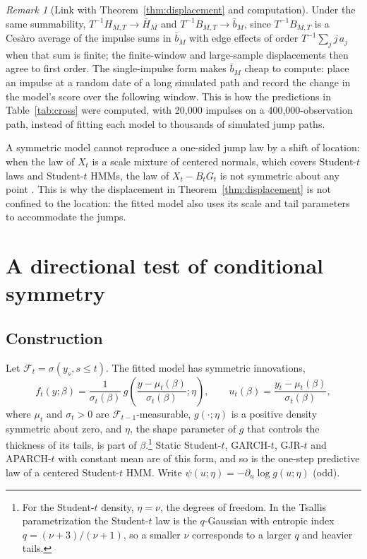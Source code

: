 \documentclass[11pt,a4paper]{article}
\theoremstyle{definition}
\theoremstyle{remark}
\newtheorem{remark}{Remark}
\newcommand{\F}{\mathcal{F}}
\begin{document}
\begin{remark}[Link with Theorem~\ref{thm:displacement} and computation]\label{rem:largeT}
Under the same summability, $T^{-1}H_{M,T}\to\bar H_M$ and $T^{-1}B_{M,T}\to\bar b_M$, since $T^{-1}B_{M,T}$ is a Ces\`aro average of the impulse sums in $\bar b_M$ with edge effects of order $T^{-1}\sum_jj\,a_j$ when that sum is finite; the finite-window and large-sample displacements then agree to first order. The single-impulse form makes $\bar b_M$ cheap to compute: place an impulse at a random date of a long simulated path and record the change in the model's score over the following window. This is how the predictions in Table~\ref{tab:cross} were computed, with 20{,}000 impulses on a 400{,}000-observation path, instead of fitting each model to thousands of simulated jump paths.
\end{remark}

\noindent A symmetric model cannot reproduce a one-sided jump law by a shift of location: when the law of $X_t$ is a scale mixture of centered normals, which covers Student-$t$ laws and Student-$t$ HMMs, the law of $X_t-B_tG_t$ is not symmetric about any point \citep{giornoB}. This is why the displacement in Theorem~\ref{thm:displacement} is not confined to the location: the fitted model also uses its scale and tail parameters to accommodate the jumps.

\section{A directional test of conditional symmetry}\label{sec:test}
\subsection{Construction}
Let $\F_t=\sigma(y_s,s\le t)$. The fitted model has symmetric innovations,
\begin{equation}\label{eq:model}
f_t(y;\beta)=\frac{1}{\sigma_t(\beta)}\,g\!\left(\frac{y-\mu_t(\beta)}{\sigma_t(\beta)};\eta\right),\qquad u_t(\beta)=\frac{y_t-\mu_t(\beta)}{\sigma_t(\beta)},
\end{equation}
where $\mu_t$ and $\sigma_t>0$ are $\F_{t-1}$-measurable, $g(\cdot;\eta)$ is a positive density symmetric about zero, and $\eta$, the shape parameter of $g$ that controls the thickness of its tails, is part of $\beta$.\footnote{For the Student-$t$ density, $\eta=\nu$, the degrees of freedom. In the Tsallis parametrization the Student-$t$ law is the $q$-Gaussian with entropic index $q=(\nu+3)/(\nu+1)$, so a smaller $\nu$ corresponds to a larger $q$ and heavier tails.} Static Student-$t$, GARCH-$t$, GJR-$t$ \citep{gjr1993} and APARCH-$t$ with constant mean are of this form, and so is the one-step predictive law of a centered Student-$t$ HMM. Write $\psi(u;\eta)=-\partial_u\log g(u;\eta)$ (odd).
\end{document}
